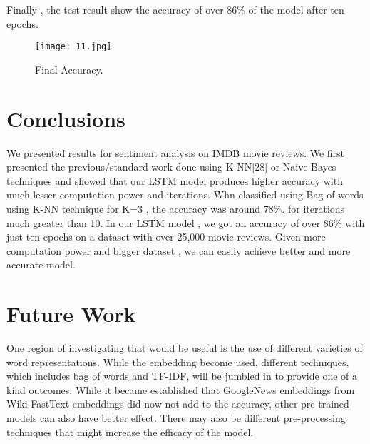 \documentclass[conference]{IEEEtran}
\begin{document}
Finally , the test result show the accuracy of over 86\% of the model after ten epochs. 

\begin{figure}[htbp!]
\centerline{\texttt{[image: 11.jpg]}}
\caption{Final Accuracy.}
\label{fig}
\end{figure}

\section{Conclusions}
We presented results for sentiment analysis on IMDB movie reviews. We first presented the previous/standard work done using K-NN[28] or Naive Bayes techniques and showed that our LSTM model produces higher accuracy with much lesser computation power and iterations. Whn classified using Bag of words using K-NN technique for K=3 , the accuracy was around 78\%. for iterations much greater than 10. In our LSTM model , we got an accuracy of over 86\% with just ten epochs on a dataset with over 25,000 movie reviews. Given more computation power and bigger dataset , we can easily achieve better and more accurate model. 

\section{Future Work}
One region of investigating that would be useful is the use of different varieties of word representations. While the
embedding become used, different techniques, which includes bag of words and TF-IDF, will be jumbled in to provide one of a kind outcomes. While it became established that GoogleNews embeddings from Wiki FastText embeddings did now not add to the accuracy, other pre-trained models can also have better effect. There may also be different pre-processing techniques that might increase the efficacy of the model.
\end{document}

